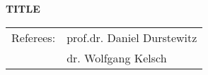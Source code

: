 
\thispagestyle{plain}

\begin{center}
\begin{large}
\vspace*{3cm}
{\Huge \textbf{TITLE}}

\vspace*{15cm}

\begin{tabular}{ll}
Referees: & prof.dr. Daniel Durstewitz \\
&  dr. Wolfgang Kelsch \\
\end{tabular}
\end{large}
\end{center}
\afterpage{\blankpage}






